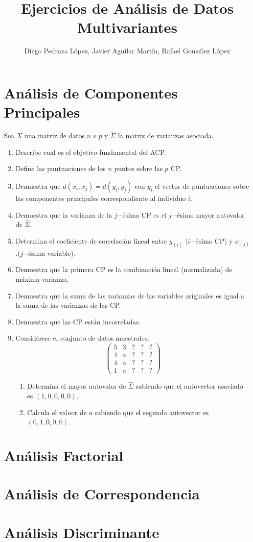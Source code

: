 \documentclass[twoside]{article}
\begin{document}
\title{Ejercicios de Análisis de Datos Multivariantes}
\author{Diego Pedraza López, Javier Aguilar Martín, Rafael González López}
\maketitle

\section{Análisis de Componentes Principales}
Sea $X$ una matriz de datos $n \times p$ y $\widehat{\Sigma}$ la matriz de varianzas asociada.

\begin{enumerate}
\item Describe cual es el objetivo fundamental del ACP. 
\item Define las puntuaciones de los $n$ puntos sobre las $p$ CP. 
\item Demuestra que $d(x_i, x_j) = d(y_i, y_j)$ con $y_i$ el vector de puntuaciones sobre las componentes principales correspondiente al individuo $i$. 
\item Demuestra que la varianza de la $j$−ésima CP es el $j$−ésimo mayor autovalor de $\widehat{\Sigma}$.
\item Determina el coeficiente de correlación lineal entre $y_{(i)}$ ($i$−ésima CP) y $x_{(j)}$ .($j$−ésima variable). 
\item Demuestra que la primera CP es la combinación lineal (normalizada) de máxima varianza. 
\item Demuestra que la suma de las varianzas de las variables originales es igual a la suma de las varianzas de las CP.
\item Demuestra que las CP están incorreladas.
\item Considérese el conjunto de datos muestrales.
\[ \begin{pmatrix}5 & 3 & ? & ? & ?\\4 & a & ? & ? & ?\\4 & a & ? & ? & ?\\1 & a & ? & ? & ?\end{pmatrix}\]
\begin{enumerate}
	\item Determina el mayor autovalor de $\widehat{\Sigma}$ sabiendo que el autovector asociado es $(1,0,0,0,0)$.
	\item Calcula el valoor de $a$ sabiendo que el segundo autovector es $(0,1,0,0,0)$.
\end{enumerate}
\end{enumerate}

\section{Análisis Factorial}

\section{Análisis de Correspondencia}

\section{Análisis Discriminante}
\end{document}
